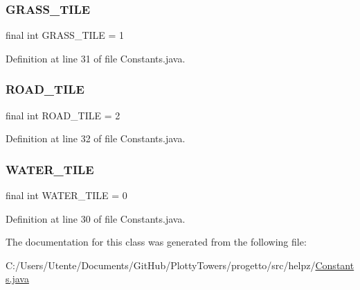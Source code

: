 \subsubsection{\texorpdfstring{G\+R\+A\+S\+S\+\_\+\+T\+I\+LE}{GRASS\_TILE}}
{\footnotesize\ttfamily final int G\+R\+A\+S\+S\+\_\+\+T\+I\+LE = 1\hspace{0.3cm}{\ttfamily [static]}}



Definition at line 31 of file Constants.\+java.

\mbox{\label{classhelpz_1_1_constants_1_1_tiles_ad9675ddcc562ae9292be2d4d25217eca}} 
\subsubsection{\texorpdfstring{R\+O\+A\+D\+\_\+\+T\+I\+LE}{ROAD\_TILE}}
{\footnotesize\ttfamily final int R\+O\+A\+D\+\_\+\+T\+I\+LE = 2\hspace{0.3cm}{\ttfamily [static]}}



Definition at line 32 of file Constants.\+java.

\mbox{\label{classhelpz_1_1_constants_1_1_tiles_a35d1252a92df8ca6a789c936b6d2e5ae}} 
\subsubsection{\texorpdfstring{W\+A\+T\+E\+R\+\_\+\+T\+I\+LE}{WATER\_TILE}}
{\footnotesize\ttfamily final int W\+A\+T\+E\+R\+\_\+\+T\+I\+LE = 0\hspace{0.3cm}{\ttfamily [static]}}



Definition at line 30 of file Constants.\+java.



The documentation for this class was generated from the following file\+:\begin{DoxyCompactItemize}
\item 
C\+:/\+Users/\+Utente/\+Documents/\+Git\+Hub/\+Plotty\+Towers/progetto/src/helpz/\hyperlink{_constants_8java}{Constants.\+java}\end{DoxyCompactItemize}

